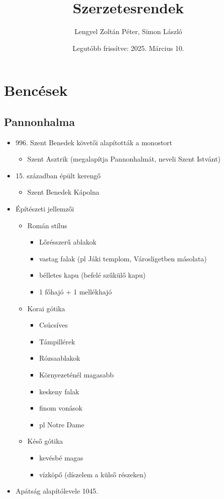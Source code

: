 \documentclass{article}
\title{Szerzetesrendek}
\author{Lengyel Zoltán Péter, Simon László}
\date{Legutóbb frissítve: 2025. Március 10.}
\begin{document}
\maketitle

\section{Bencések}
\subsection{Pannonhalma}
\begin{itemize}
    \item 996. Szent Benedek követői alapították a monostort
    \begin{itemize}
        \item Szent Asztrik (megalapítja Pannonhalmát, neveli Szent Istvánt)
    \end{itemize}
    \item 15. században épült kerengő
    \begin{itemize}
        \item Szent Benedek Kápolna
    \end{itemize}
    \item Építészeti jellemzői
    \begin{itemize}
        \item Román stílus
        \begin{itemize}
            \item Lőrésszerű ablakok
            \item vastag falak (pl Jáki templom, Városligetben másolata)
            \item bélletes kapu (befelé szűkülő kapu)
            \item 1 főhajó + 1 mellékhajó
        \end{itemize}
        \item Korai gótika 
        \begin{itemize}
            \item Csúcsíves
            \item Támpillérek
            \item Rózsaablakok
            \item Környezeténél magasabb
            \item keskeny falak
            \item finom vonások
            \item pl Notre Dame
        \end{itemize}
        \item Késő gótika
        \begin{itemize}
            \item kevésbé magas
            \item vízköpő (díszelem a külső részeken)
        \end{itemize}
    \end{itemize}
    \item Apátság alapítólevele 1045.
\end{itemize}
\end{document}
